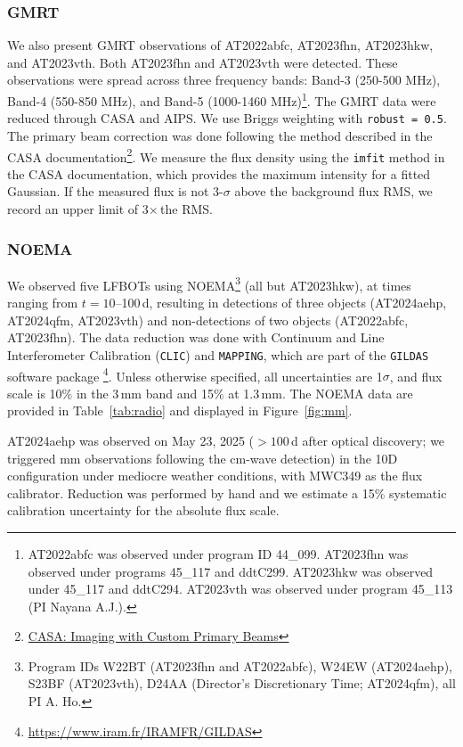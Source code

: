 \documentclass[twocolumn,twocolappendix, linenumbers, trackchanges]{aastex7}
\begin{document}
\subsubsection{GMRT}
We also present GMRT observations of  AT2022abfc, AT2023fhn, AT2023hkw, and AT2023vth. Both AT2023fhn and AT2023vth were detected. These observations were spread across three frequency bands: Band-3 (250-500 MHz), Band-4 (550-850 MHz), and Band-5 (1000-1460 MHz)\footnote{AT2022abfc was observed under program ID 44\_099.  AT2023fhn was observed under programs 45\_117 and ddtC299.  AT2023hkw was observed under 45\_117 and ddtC294.  AT2023vth was observed under program 45\_113 (PI Nayana A.J.).}.
The GMRT data were reduced through CASA and AIPS.  We use Briggs weighting with \texttt{robust = 0.5}.  The primary beam correction was done following the method described in the CASA documentation\footnote{\href{https://casadocs.readthedocs.io/en/latest/examples/community/Example_Wideband_PrimaryBeamCorrection.html\#Imaging-With-Custom-Primary-Beams}{CASA: Imaging with Custom Primary Beams}}.  We measure the flux density using the \texttt{imfit} method in the CASA documentation, which provides the maximum intensity for a fitted Gaussian.  If the measured flux is not 3-$\sigma$ above the background flux RMS, we record an upper limit of 3$\times\,$the RMS. 

\subsubsection{NOEMA}

We observed five LFBOTs using NOEMA\footnote{Program IDs W22BT (AT2023fhn and AT2022abfc), W24EW (AT2024aehp), S23BF (AT2023vth), D24AA (Director's Discretionary Time; AT2024qfm), all PI A. Ho.} (all but AT2023hkw), at times ranging from $t=10$--100\,d, resulting in detections of three objects (AT2024aehp, AT2024qfm, AT2023vth) and non-detections of two objects (AT2022abfc, AT2023fhn). The data reduction was done with Continuum and Line Interferometer Calibration (\texttt{CLIC}) and \texttt{MAPPING}, which are part of the \texttt{GILDAS} software package \citep{gildas}\footnote{\href{https://www.iram.fr/IRAMFR/GILDAS}{https://www.iram.fr/IRAMFR/GILDAS}}. Unless otherwise specified, all uncertainties are 1$\sigma$, and  flux scale is 10\% in the 3\,mm band and 15\% at 1.3\,mm. The NOEMA data are provided in Table~\ref{tab:radio} and displayed in Figure~\ref{fig:mm}. 

AT2024aehp was observed on May 23, 2025 ($>100\,$d after optical discovery; we triggered mm observations following the cm-wave detection) in the 10D configuration under mediocre weather conditions, with MWC349 as the flux calibrator. Reduction was performed by hand and we estimate a 15\% systematic calibration uncertainty for the absolute flux scale. 
\end{document}
